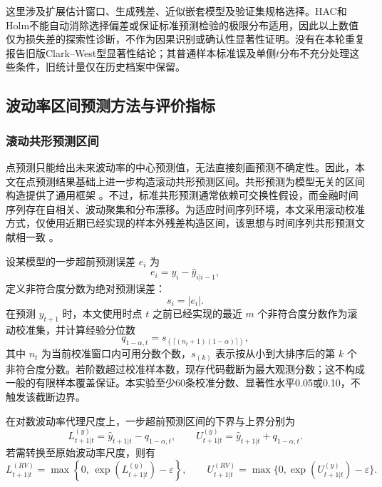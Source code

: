 这里涉及扩展估计窗口、生成残差、近似嵌套模型及验证集规格选择。HAC和Holm不能自动消除选择偏差或保证标准预测检验的极限分布适用，因此以上数值仅为损失差的探索性诊断，不作为因果识别或确认性显著性证明。没有在本轮重复报告旧版Clark--West型显著性结论；其普通样本标准误及单侧$t$分布不充分处理这些条件，旧统计量仅在历史档案中保留\citep{ClarkWest2007}。

\subsection{波动率区间预测方法与评价指标}

\subsubsection{滚动共形预测区间}

点预测只能给出未来波动率的中心预测值，无法直接刻画预测不确定性。因此，本文在点预测结果基础上进一步构造滚动共形预测区间。共形预测为模型无关的区间构造提供了通用框架 \citep{Vovk2005,ShaferVovk2008,Lei2018}。不过，标准共形预测通常依赖可交换性假设，而金融时间序列存在自相关、波动聚集和分布漂移。为适应时间序列环境，本文采用滚动校准方式，仅使用近期已经实现的样本外残差构造区间，该思想与时间序列共形预测文献相一致 \citep{XuXie2021}。

设某模型的一步超前预测误差 $e_i$ 为
\begin{equation}
	e_i=y_i-\hat{y}_{i|i-1},
\end{equation}
定义非符合度分数为绝对预测误差：
\begin{equation}
	s_i=|e_i|.
\end{equation}
在预测 \(y_{t+1}\) 时，本文使用时点 \(t\) 之前已经实现的最近 \(m\) 个非符合度分数作为滚动校准集，并计算经验分位数
\begin{equation}
	q_{1-\alpha,t}
	=
	s_{(\lceil(n_t+1)(1-\alpha)\rceil)},
\end{equation}
其中 \(n_t\) 为当前校准窗口内可用分数个数，\(s_{(k)}\) 表示按从小到大排序后的第 \(k\) 个非符合度分数。若阶数超过校准样本数，现存代码截断为最大观测分数；这不构成一般的有限样本覆盖保证。本实验至少60条校准分数、显著性水平0.05或0.10，不触发该截断边界。

在对数波动率代理尺度上，一步超前预测区间的下界与上界分别为
\begin{equation}
	L^{(y)}_{t+1|t}
	=
	\hat{y}_{t+1|t}
	-
	q_{1-\alpha,t},
	\qquad
	U^{(y)}_{t+1|t}
	=
	\hat{y}_{t+1|t}
	+
	q_{1-\alpha,t}.
\end{equation}
若需转换至原始波动率尺度，则有
\begin{equation}
	L^{(RV)}_{t+1|t}
	=
	\max\left\{
	0,\,
	\exp(L^{(y)}_{t+1|t})-\varepsilon
	\right\},
	\qquad
	U^{(RV)}_{t+1|t}
	=
	\max\{0,\exp(U^{(y)}_{t+1|t})-\varepsilon\}.
\end{equation}

